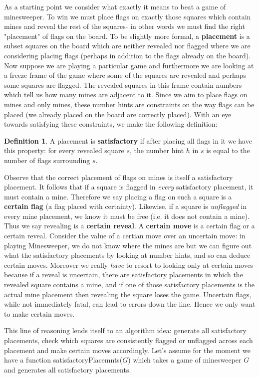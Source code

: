\documentclass{article}
\theoremstyle{definition}
\newtheorem{definition}{Definition}
\theoremstyle{definition}
\theoremstyle{theorem}
\begin{document}
	As a starting point we consider what exactly it means to beat a game of minesweeper. To win we must place flags on exactly those squares which contain mines and reveal the rest of the squares- in other words we must find the right "placement" of flags on the board. To be slightly more formal, a \textbf{placement} is a subset squares on the board which are neither revealed nor flagged where we are considering placing flags (perhaps in addition to the flags already on the board). Now suppose we are playing a particular game and furthermore we are looking at a freeze frame of the game where some of the squares are revealed and perhaps some squares are flagged. The revealed squares in this frame contain numbers which tell us how many mines are adjacent to it. Since we aim to place flags on mines and only mines, these number hints are constraints on the way flags can be placed (we already placed on the board are correctly placed). With an eye towards satisfying these constraints, we make the following definition:
	\begin{definition}
		A placement is \textbf{satisfactory} if after placing all flags in it we have this property: for every revealed square $s$, the number hint $h$ in $s$ is equal to the number of flags surrounding $s$.
	\end{definition}
	Observe that the correct placement of flags on mines is itself a satisfactory placement. It follows that if a square is flagged in \textit{every} satisfactory placement, it must contain a mine. Therefore we say placing a flag on such a square is a \textbf{certain flag} (a flag placed with certainty). Likewise, if a square is \textit{unflagged} in every mine placement, we know it must be free (i.e. it does not contain a mine). Thus we say revealing is a \textbf{certain reveal}. A \textbf{certain move} is a certain flag or a certain reveal. Consider the value of a certian move over an uncertain move: in playing Minesweeper, we do not know where the mines are but we can figure out what the satisfactory placements by looking at number hints, and so can deduce certain moves. Moreover we really \textit{have} to resort to looking only at certain moves because if a reveal is uncertain, there are satisfactory placements in which the revealed square contains a mine, and if one of those satisfactory placements is the actual mine placement then revealing the square loses the game. Uncertain flags, while not immediately fatal, can lead to errors down the line. Hence we only want to make certain moves. 
	
	This line of reasoning lends itself to an algorithm idea: generate all satisfactory placements, check which squares are consistently flagged or unflagged across each placement and make certain moves accordingly. Let's assume for the moment we have a function satisfactoryPlacemnts($G$) which takes a game of minesweeper $G$ and generates all satisfactory placements.
	
\end{document}
